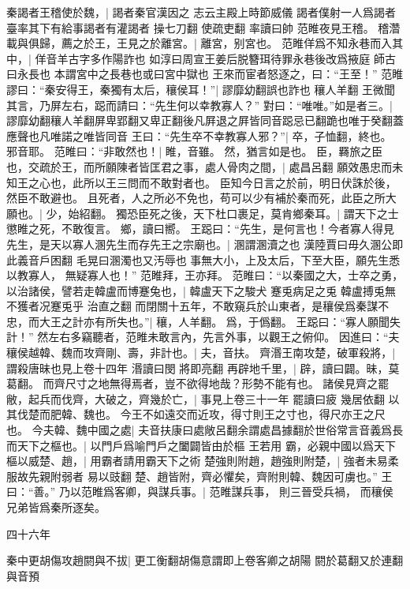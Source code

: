 秦謁者王稽使於魏，|{
	謁者秦官漢因之
	志云主殿上時節威儀
	謁者僕射一人爲謁者臺率其下有給事謁者有灌謁者
	操七刀翻
	使疏吏翻
	率讀曰帥
	}
范睢夜見王稽。
稽濳載與俱歸，薦之於王，王見之於離宮。|{
	離宮，别宮也。
	}
范睢佯爲不知永巷而入其中，|{
	佯音羊古字多作陽詐也
	如淳曰周宣王姜后脱簪珥待罪永巷後改爲掖庭
	師古曰永長也
	本謂宮中之長巷也或曰宮中獄也}
王來而宦者怒逐之，曰：“王至！”
范睢謬曰：“秦安得王，秦獨有太后，穰侯耳！”|{
	謬靡幼翻誤也詐也
	穰人羊翻}
王微聞其言，乃屏左右，跽而請曰：“先生何以幸教寡人？”
對曰：“唯唯。”如是者三。|{
	謬靡幼翻穰人羊翻屏卑郢翻又卑正翻後凡屛退之屛皆同音跽忌已翻跪也唯于癸翻蓋應聲也凡唯諾之唯皆同音}
王曰：“先生卒不幸教寡人邪？”|{
	卒，子恤翻，終也。
	邪音耶。
	}
范睢曰：“非敢然也！|{
	睢，音雖。
	然，猶言如是也。
	}
臣，羇旅之臣也，交疏於王，而所願陳者皆匡君之事，處人骨肉之間，|{
	處昌呂翻
	}
願效愚忠而未知王之心也，此所以王三問而不敢對者也。
臣知今日言之於前，明日伏誅於後，然臣不敢避也。
且死者，人之所必不免也，苟可以少有補於秦而死，此臣之所大願也。|{
	少，始紹翻。
	}
獨恐臣死之後，天下杜口裹足，莫肯鄉秦耳。|{
	謂天下之士懲睢之死，不敢復言。
	鄉，讀曰嚮。
	}
王跽曰：“先生，是何言也！今者寡人得見先生，是天以寡人溷先生而存先王之宗廟也。|{
	溷謂溷瀆之也
	漢陸賈曰毋久溷公即此義音戶困翻
	毛晃曰溷濁也又汚辱也
	}
事無大小，上及太后，下至大臣，願先生悉以教寡人，
無疑寡人也！”
范睢拜，王亦拜。
范睢曰：“以秦國之大，士卒之勇，以治諸侯，譬若走韓盧而博蹇兔也，|{%
	韓盧天下之駿犬
	蹇兎病足之兎
	韓盧搏兎無不獲者况蹇兎乎
	治直之翻
	}
而閉關十五年，不敢窺兵於山東者，是穰侯爲秦謀不忠，而大王之計亦有所失也。”|{
	穰，人羊翻。
	爲，于僞翻。
	}
王跽曰：“寡人願聞失計！”
然左右多竊聽者，范睢未敢言內，先言外事，以觀王之俯仰。
因進曰：“夫穰侯越韓、魏而攻齊剛、壽，非計也。|{
	夫，音扶。
	}
齊湣王南攻楚，破軍殺將，|{
	謂殺唐昧也見上卷十四年
	湣讀曰閔
	將即亮翻
	}
再辟地千里，|{
	辟，讀曰闢。昧，莫葛翻。
	}
而齊尺寸之地無得焉者，豈不欲得地哉？形勢不能有也。
諸侯見齊之罷敝，起兵而伐齊，大破之，齊幾於亡，|{
	事見上卷三十一年
	罷讀曰疲
	幾居依翻
	}
以其伐楚而肥韓、魏也。
今王不如遠交而近攻，得寸則王之寸也，得尺亦王之尺也。
今夫韓、魏中國之處|{
	夫音扶康曰處敞呂翻余謂處昌據翻於世俗常言音義爲長}
而天下之樞也。|{
	以門戶爲喻門戶之闔闢皆由於樞}
王若用%
霸，必親中國以爲天下樞以威楚、趙，|{
	用霸者請用霸天下之術}
楚強則附趙，趙強則附楚，|{
	強者未易柔服故先親附弱者
	易以豉翻}
楚、趙皆附，齊必懼矣，齊附則韓、魏因可虜也。”
王曰：“善。”
乃以范睢爲客卿，與謀兵事。|{
	范睢謀兵事，
	則三晉受兵禍，
	而穰侯兄弟皆爲秦所逐矣。
	}


四十六年


秦中更胡傷攻趙閼與不拔|{
	更工衡翻胡傷意謂即上卷客卿之胡陽
	閼於葛翻又於連翻
	與音預
	}


